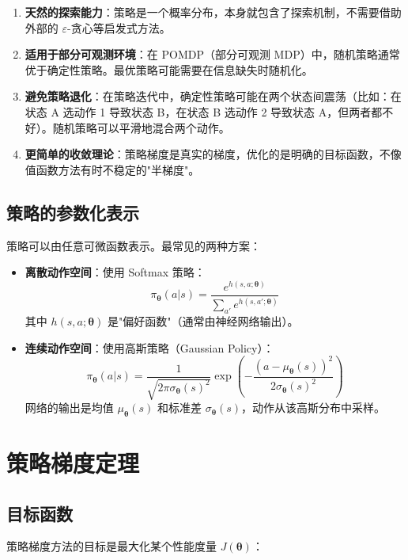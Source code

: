\begin{enumerate}
    \item \textbf{天然的探索能力}：策略是一个概率分布，本身就包含了探索机制，不需要借助外部的 $\varepsilon$-贪心等启发式方法。
    \item \textbf{适用于部分可观测环境}：在 POMDP（部分可观测 MDP）中，随机策略通常优于确定性策略。最优策略可能需要在信息缺失时随机化。
    \item \textbf{避免策略退化}：在策略迭代中，确定性策略可能在两个状态间震荡（比如：在状态 A 选动作 1 导致状态 B，在状态 B 选动作 2 导致状态 A，但两者都不好）。随机策略可以平滑地混合两个动作。
    \item \textbf{更简单的收敛理论}：策略梯度是真实的梯度，优化的是明确的目标函数，不像值函数方法有时不稳定的"半梯度"。
\end{enumerate}

\subsection{策略的参数化表示}

策略可以由任意可微函数表示。最常见的两种方案：

\begin{itemize}
    \item \textbf{离散动作空间}：使用 Softmax 策略：
    $$\pi_{\boldsymbol{\theta}}(a|s) = \frac{e^{h(s,a;\boldsymbol{\theta})}}{\sum_{a'} e^{h(s,a';\boldsymbol{\theta})}}$$
    其中 $h(s,a;\boldsymbol{\theta})$ 是"偏好函数"（通常由神经网络输出）。

    \item \textbf{连续动作空间}：使用高斯策略（Gaussian Policy）：
    $$\pi_{\boldsymbol{\theta}}(a|s) = \frac{1}{\sqrt{2\pi\sigma_{\boldsymbol{\theta}}(s)^2}} \exp\left(-\frac{(a - \mu_{\boldsymbol{\theta}}(s))^2}{2\sigma_{\boldsymbol{\theta}}(s)^2}\right)$$
    网络的输出是均值 $\mu_{\boldsymbol{\theta}}(s)$ 和标准差 $\sigma_{\boldsymbol{\theta}}(s)$，动作从该高斯分布中采样。
\end{itemize}

\section{策略梯度定理}

\subsection{目标函数}

策略梯度方法的目标是最大化某个性能度量 $J(\boldsymbol{\theta})$：

